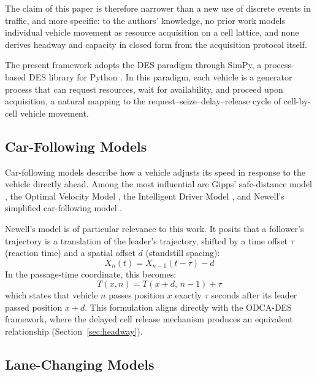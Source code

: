 \documentclass[review,number]{elsarticle}
\begin{document}
The claim of this paper is therefore narrower than a new use of discrete events in traffic, and more specific: to the authors' knowledge, no prior work models individual vehicle movement as resource acquisition on a cell lattice, and none derives headway and capacity in closed form from the acquisition protocol itself.

The present framework adopts the DES paradigm through SimPy, a process-based DES library for Python \citep{simpy2023}. In this paradigm, each vehicle is a generator process that can request resources, wait for availability, and proceed upon acquisition, a natural mapping to the request--seize--delay--release cycle of cell-by-cell vehicle movement.

\subsection{Car-Following Models}
\label{sec:lit_cf}

Car-following models describe how a vehicle adjusts its speed in response to the vehicle directly ahead. Among the most influential are Gipps' safe-distance model \citep{gipps1981behavioural}, the Optimal Velocity Model \citep{bando1995dynamical}, the Intelligent Driver Model \citep{treiber2000congested}, and Newell's simplified car-following model \citep{newell2002simplified}.

Newell's model is of particular relevance to this work. It posits that a follower's trajectory is a translation of the leader's trajectory, shifted by a time offset $\tau$ (reaction time) and a spatial offset $d$ (standstill spacing):
\begin{equation}
    X_{n}(t) = X_{n-1}(t - \tau) - d
    \label{eq:newell_cf}
\end{equation}
In the passage-time coordinate, this becomes:
\begin{equation}
    T(x, n) = T(x + d,\, n-1) + \tau
    \label{eq:newell_cf_Txn}
\end{equation}
which states that vehicle $n$ passes position $x$ exactly $\tau$ seconds after its leader passed position $x + d$. This formulation aligns directly with the ODCA-DES framework, where the delayed cell release mechanism produces an equivalent relationship (Section~\ref{sec:headway}).

\subsection{Lane-Changing Models}
\label{sec:lit_lc}
\end{document}

